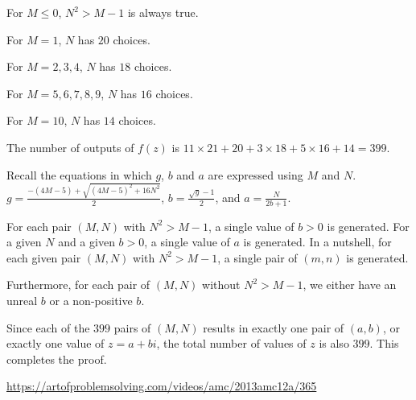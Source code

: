 \begin{enumerate}
 
For $M\leq{0}$, $N^2>M-1$ is always true.

 For $M=1$, $N$ has $20$ choices.

 For $M=2,3,4$, $N$ has $18$ choices.

 For $M=5,6,7,8,9$, $N$ has $16$ choices.

 For $M=10$, $N$ has $14$ choices.

 
The number of outputs of $f(z)$ is $11\times{21}+20+3\times{18}+5\times{16}+14=399$.

 
Recall the equations in which $g$, $b$ and $a$ are expressed using $M$ and $N$. $g=\frac{-(4M-5)+\sqrt{(4M-5)^2+16N^2}}{2}$, $b=\frac{\sqrt{g}-1}{2}$, and $a=\frac{N}{2b+1}$.

 
For each pair $(M,N)$ with $N^2>M-1$, a single value of $b>0$ is generated. For a given $N$ and a given $b>0$, a single value of $a$ is generated. In a nutshell, for each given pair $(M,N)$ with $N^2>M-1$, a single pair of $(m,n)$ is generated.

 
Furthermore, for each pair of $(M,N)$ without $N^2>M-1$, we either have an unreal $b$ or a non-positive $b$.

 
Since each of the $399$ pairs of $(M,N)$ results in exactly one pair of $(a,b)$, or exactly one value of $z=a+bi$, the total number of values of $z$ is also $399$. This completes the proof.

 \href{https://artofproblemsolving.com/videos/amc/2013amc12a/365}{https://artofproblemsolving.com/videos/amc/2013amc12a/365}

 


\end{enumerate}